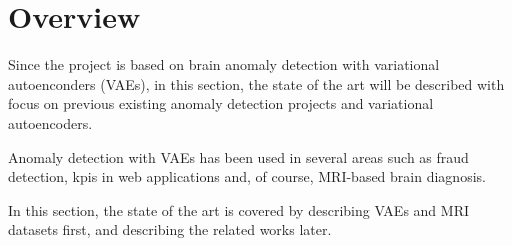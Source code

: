 \section{Overview}

Since the project is based on brain anomaly detection with variational autoenconders (VAEs), in this section, the state of the art will be described with focus on previous existing anomaly detection projects and variational autoencoders.

Anomaly detection with VAEs has been used in several areas such as fraud detection, \Gls{kpi}s in web applications and, of course, MRI-based brain diagnosis.

In this section, the state of the art is covered by describing VAEs and MRI datasets first, and describing the related works later.
